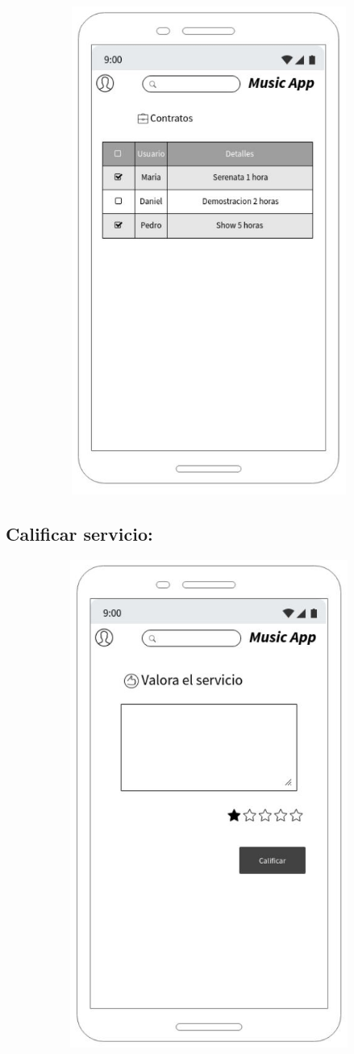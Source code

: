 \begin{figure}[hbt!]
 \centering
\includegraphics[width=12cm, height=16cm,keepaspectratio=true]{Desarrollo/Interfaces/imgs/wire6.JPG}
\end{figure}
\newpage
\subsection{Calificar servicio:}

\begin{figure}[hbt!]
 \centering
\includegraphics[width=12cm, height=16cm,keepaspectratio=true]{Desarrollo/Interfaces/imgs/wire7.JPG}
\end{figure}